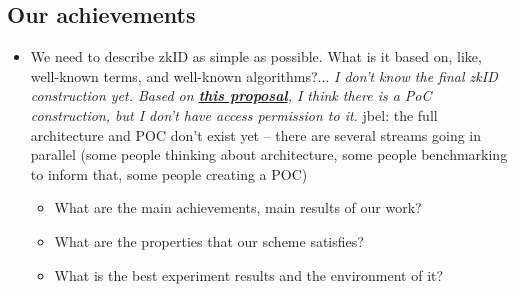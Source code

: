 \documentclass{iacrtrans}
\newcommand{\jbel}[1]{{\color{blue}{}jbel: #1}}
\begin{document}
\subsection{Our achievements}
\begin{itemize}
    \item We need to describe zkID as simple as possible. What is it based on, like, well-known terms, and well-known algorithms?... \textit{I don't know the final zkID construction yet. Based on \href{https://pse-team.notion.site/zkID-Team-Strategy-Proposal-db3c5788dc7a4916a33e580a79177053}{\textbf{this proposal}}, I think there is a PoC construction, but I don't have access permission to it.}
    \jbel{the full architecture and POC don't exist yet -- there are several streams going in parallel (some people thinking about architecture, some people benchmarking to inform that, some people creating a POC)}
    \begin{itemize}
        \item What are the main achievements, main results of our work?
        \item What are the properties that our scheme satisfies?
        \item What is the best experiment results and the environment of it?
    \end{itemize} 
\end{itemize}
\end{document}
